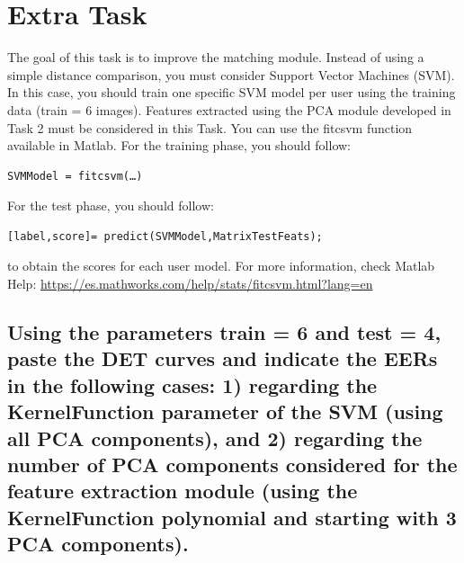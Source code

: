 \documentclass[a4paper]{article}
\begin{document}
\section{Extra Task}

The goal of this task is to improve the matching module. Instead of using a simple distance comparison, you must consider Support Vector Machines (SVM). In this case, you should train one specific SVM model per user using the training data (train = 6 images).
Features extracted using the PCA module developed in Task 2 must be considered in this Task. 
You can use the fitcsvm function available in Matlab. For the training phase, you should follow:
\begin{verbatim}
SVMModel = fitcsvm(…)
\end{verbatim}
For the test phase, you should follow:
\begin{verbatim}
[label,score]= predict(SVMModel,MatrixTestFeats);
\end{verbatim}
to obtain the scores for each user model. 
For more information, check Matlab Help:
\url{https://es.mathworks.com/help/stats/fitcsvm.html?lang=en} 
\subsection{ Using the parameters train = 6 and test = 4, paste the DET curves and indicate the EERs in the following cases: 1) regarding the KernelFunction parameter of the SVM (using all PCA components), and 2) regarding the number of PCA components considered for the feature extraction module (using the KernelFunction polynomial and starting with 3 PCA components).}
\end{document}

